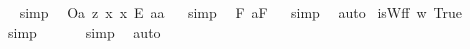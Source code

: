 \begin{isabellebody}
\isadelimproof
\ %
\endisadelimproof
%
\isatagproof
{}\isamarkupfalse%
\ simp\ \isamarkupfalse%
%
\endisatagproof
{\isafoldproof}%
%
\isadelimproof
%
\endisadelimproof
\isanewline
{}\isamarkupfalse%
\ {\isachardoublequoteopen}{\isacharbrackleft}{\isacharless}O\isactrlsup {\isacharbang}{\isasymbullet}a{\isachargreater}\ {\isasymrightarrow}\isactrlsup z\ {\isacharless}{\isasymlambda}x{\isachardot}\ {\isachardot}x{\isachardot}\ {\isacharequal}\isactrlsub E\ a{\isacharparenright}{\isasymbullet}a{\isachargreater}{\isacharbrackright}{\isachardoublequoteclose}%
\isadelimproof
\ %
\endisadelimproof
%
\isatagproof
{}\isamarkupfalse%
\ simp\ \isamarkupfalse%
%
\endisatagproof
{\isafoldproof}%
%
\isadelimproof
%
\endisadelimproof
\isanewline
\isanewline
{}\isamarkupfalse%
\ {\isachardoublequoteopen}{\isacharbrackleft}{\isacharparenleft}{\isasymexists}{\isacharparenleft}{\isasymlambda}F{\isachardot}\ {\isacharless}a{\isasymcirc}{\isachardot}F{\isachardot}{\isachargreater}{\isacharparenright}{\isacharparenright}{\isacharbrackright}{\isachardoublequoteclose}%
\isadelimproof
\ %
\endisadelimproof
%
\isatagproof
{}\isamarkupfalse%
\ simp\ \isamarkupfalse%
\ auto%
\endisatagproof
{\isafoldproof}%
%
\isadelimproof
%
\endisadelimproof
\isanewline
\isanewline
{}\isamarkupfalse%
\ {\isachardoublequoteopen}isWff\ {\isacharcomma}{\isacharparenleft}{\isasymlambda}w{\isachardot}\ True{\isacharparenright}{\isacharcomma}{\isachardoublequoteclose}%
\isadelimproof
\ %
\endisadelimproof
%
\isatagproof
{}\isamarkupfalse%
\ simp\ \isamarkupfalse%
%
\endisatagproof
{\isafoldproof}%
%
\isadelimproof
%
\endisadelimproof
\isanewline
\isanewline
{}\isamarkupfalse%
\ {\isachardoublequoteopen}{\isacharbrackleft}{\isacharparenleft}{\isasymexists}{\isacharparenleft}{\isasymlambda}{\isasymphi}{\isachardot}\ {\isacharcomma}{\isasymphi}{\isacharcomma}{\isacharparenright}{\isacharparenright}{\isacharbrackright}{\isachardoublequoteclose}%
\isadelimproof
\ %
\endisadelimproof
%
\isatagproof
{}\isamarkupfalse%
\ simp\ \isamarkupfalse%
\ auto%
\endisatagproof
{\isafoldproof}%
%
\isadelimproof
%
\endisadelimproof
\isanewline
{}\isamarkupfalse%
\ {\isachardoublequoteopen}{\isacharbrackleft}{\isacharparenleft}{\isasymexists}{\isacharparenleft}{\isasymlambda}{\isasymphi}{\isachardot}\ {\isacharsemicolon}{\isasymphi}{\isacharsemicolon}{\isacharparenright}{\isacharparenright}{\isacharbrackright}{\isachardoublequoteclose}%

\end{isabellebody}
